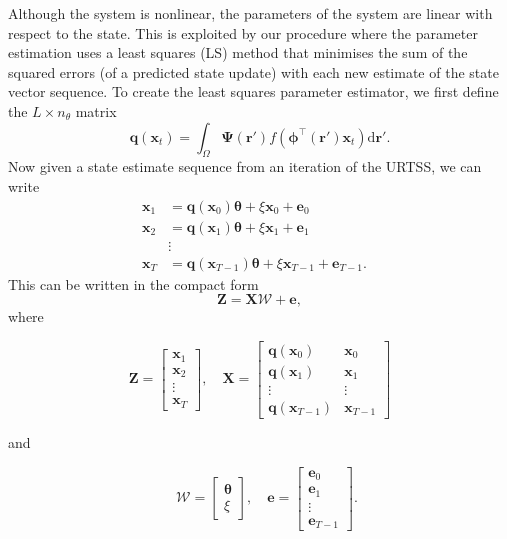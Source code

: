 \documentclass[10pt]{article}
\begin{document}
Although the system is nonlinear, the parameters of the system are linear with respect to the state. This is exploited by our procedure where the parameter estimation uses a least squares (LS) method that minimises the sum of the squared errors (of a predicted state update) with each new estimate of the state vector sequence. To create the least squares parameter estimator, we first define the $L \times n_{\theta}$ matrix
\begin{equation}
	\mathbf{q}(\mathbf{x}_t) = \int_\Omega \boldsymbol{\Psi}(\mathbf{r}') f(\boldsymbol{\phi}^{\top}(\mathbf{r}')\mathbf{x}_t) \textrm{d}\mathbf{r}'.
\end{equation}
Now given a state estimate sequence from an iteration of the URTSS, we can write
\begin{align*}
	\mathbf x_{1} &= \mathbf{q}(\mathbf x_0) \boldsymbol{\theta}+\xi\mathbf x_0+\mathbf e_0 \\
	\mathbf x_{2} &= \mathbf{q}(\mathbf x_1) \boldsymbol{\theta}+\xi\mathbf x_1+\mathbf e_1  \\
	&\vdots& \\
	\mathbf x_{T}&=\mathbf{q}(\mathbf x_{T-1}) \boldsymbol{\theta}+\xi\mathbf x_{T-1}+\mathbf e_{T-1}. 
\end{align*}
This can be written in the compact form
\begin{equation}
	\mathbf Z=\mathbf X \mathcal W+\mathbf{e}, 
\end{equation}
where
\begin{small}
\begin{equation*}
	\mathbf Z=\left[
	\begin{array}{cccc}
		\mathbf x_{1}\\
		\mathbf x_{2}\\
		\vdots\\
		\mathbf x_{T}
	\end{array}
	\right],\quad \mathbf X=\left[
	\begin{array}{cccc}
		\mathbf q(\mathbf x_0)& \mathbf x_{0}\\
		\mathbf q(\mathbf x_1)& \mathbf x_{1}\\
		\vdots & \vdots\\
		\mathbf q(\mathbf x_{T-1})& \mathbf x_{T-1}
	\end{array}
	\right] 
\end{equation*}
\end{small}
and
\begin{small}
\begin{equation*}
\quad \mathcal W=\left[
	\begin{array}{cc}
		\boldsymbol{\theta} \\
		\xi
	\end{array}
	\right],\quad \mathbf{e}=\left[
	\begin{array}{cccc}
		\mathbf e_0\\
		\mathbf e_1\\
		\vdots\\
		\mathbf e_{T-1}
	\end{array}
	\right].
\end{equation*}
\end{small}
\end{document}
